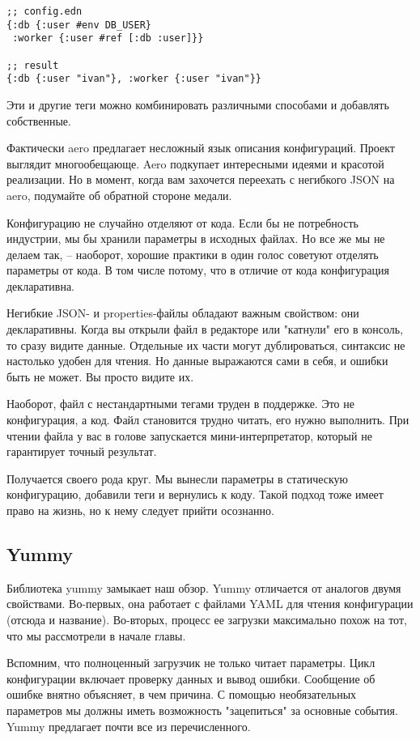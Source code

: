 \begin{verbatim}
;; config.edn
{:db {:user #env DB_USER}
 :worker {:user #ref [:db :user]}}

;; result
{:db {:user "ivan"}, :worker {:user "ivan"}}
\end{verbatim}

Эти и другие теги можно комбинировать различными способами и добавлять
собственные.

Фактически aero предлагает несложный язык описания конфигураций. Проект выглядит
многообещающе. Aero подкупает интересными идеями и красотой реализации. Но в
момент, когда вам захочется переехать с негибкого JSON на aero, подумайте об
обратной стороне медали.

Конфигурацию не случайно отделяют от кода. Если бы не потребность индустрии, мы
бы хранили параметры в исходных файлах. Но все же мы не делаем так, -- наоборот,
хорошие практики в один голос советуют отделять параметры от кода. В том числе
потому, что в отличие от кода конфигурация декларативна.

Негибкие JSON- и properties-файлы обладают важным свойством: они
декларативны. Когда вы открыли файл в редакторе или "катнули" его в консоль, то
сразу видите данные. Отдельные их части могут дублироваться, синтаксис не
настолько удобен для чтения. Но данные выражаются сами в себя, и ошибки быть не
может. Вы просто видите их.

Наоборот, файл с нестандартными тегами труден в поддержке. Это не конфигурация,
а код. Файл становится трудно читать, его нужно выполнить. При чтении файла у
вас в голове запускается мини-интерпретатор, который не гарантирует точный
результат.

Получается своего рода круг. Мы вынесли параметры в статическую конфигурацию,
добавили теги и вернулись к коду. Такой подход тоже имеет право на жизнь, но к
нему следует прийти осознанно.

\subsection{Yummy}

Библиотека yummy замыкает наш обзор. Yummy отличается от аналогов двумя
свойствами. Во-первых, она работает с файлами YAML для чтения конфигурации
(отсюда и название). Во-вторых, процесс ее загрузки максимально похож на тот,
что мы рассмотрели в начале главы.

Вспомним, что полноценный загрузчик не только читает параметры. Цикл
конфигурации включает проверку данных и вывод ошибки. Сообщение об ошибке внятно
объясняет, в чем причина. С помощью необязательных параметров мы должны иметь
возможность "зацепиться" за основные события. Yummy предлагает почти все из
перечисленного.

